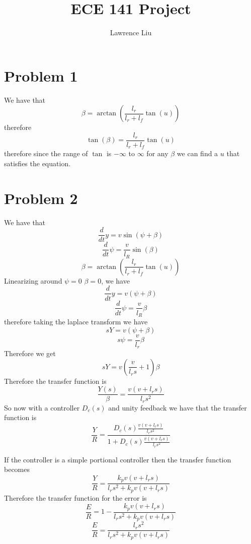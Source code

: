 \documentclass[12pt]{article}
\title{ECE 141 Project}
\author{Lawrence Liu}
\begin{document}
\maketitle
\section*{Problem 1}
We have that $$\beta=\arctan(\frac{l_r}{l_r+l_f}\tan(u))$$
therefore
$$\tan(\beta)=\frac{l_r}{l_r+l_f}\tan(u)$$
therefore since the range of $\tan$ is $-\infty$ to $\infty$ for any $\beta$ we can find a $u$ that satisfies the equation.

\section*{Problem 2}
We have that
$$\frac{d}{dt}y=v\sin(\psi+\beta)$$
$$\frac{d}{dt}\psi=\frac{v}{l_R}\sin(\beta)$$
$$\beta=\arctan(\frac{l_r}{l_r+l_f}\tan(u))$$
Linearizing around $\psi=0$ $\beta=0$, we have
$$\frac{d}{dt}y=v(\psi+\beta)$$
$$\frac{d}{dt}\psi=\frac{v}{l_R}\beta$$
therefore taking the laplace transform we have
$$sY=v(\psi+\beta)$$
$$s\psi=\frac{v}{l_r}\beta$$
Therefore we get
$$sY=v(\frac{v}{l_r s}+1)\beta$$
Therefore the transfer function is
$$\frac{Y(s)}{\beta}=\frac{v(v+l_r s)}{l_r s^2}$$
So now with a controller $D_c(s)$ and unity feedback we have that the transfer function is
$$\frac{Y}{R}=\frac{D_c(s)\frac{v(v+l_r s)}{l_r s^2}}{1+D_c(s)\frac{v(v+l_r s)}{l_r s^2}}$$

If the controller is a simple portional controller then the transfer function becomes
$$\frac{Y}{R}=\frac{k_pv(v+l_r s)}{l_r s^2+k_pv(v+l_r s)}$$
Therefore the transfer function for the error is 
$$\frac{E}{R}=1-\frac{k_pv(v+l_r s)}{l_r s^2+k_pv(v+l_r s)}$$
$$\frac{E}{R}=\frac{l_r s^2}{l_r s^2+k_pv(v+l_r s)}$$
\end{document}
